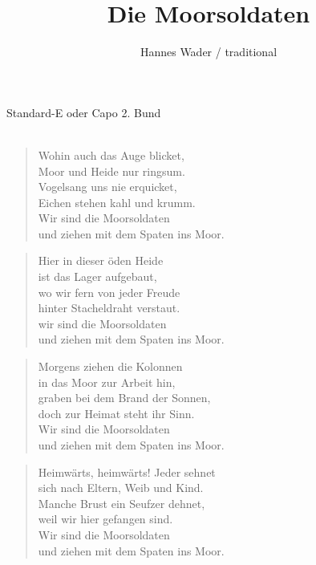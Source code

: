 \documentclass[9pt,a4paper,oneside, onecolumn]{article}
\author{Hannes Wader / traditional}
\title{Die Moorsoldaten}
\date{}
\begin{document}
\maketitle
\thispagestyle{empty}

Standard-E oder Capo 2. Bund\\
\mbox{
}\\


\begin{verse}
 
Wohin auch das Auge blicket,\\
Moor und Heide nur ringsum.\\
Vogelsang uns nie erquicket, \\
Eichen stehen kahl und krumm.\\
Wir sind die Moorsoldaten \\
und ziehen mit dem Spaten ins Moor.\\
\end{verse}

\begin{verse}
Hier in dieser öden Heide\\
ist das Lager aufgebaut,\\
wo wir fern von jeder Freude\\
hinter Stacheldraht verstaut.\\
wir sind die Moorsoldaten\\
und ziehen mit dem Spaten ins Moor.\\
\end{verse}

\begin{verse}
Morgens ziehen die Kolonnen\\
in das Moor zur Arbeit hin,\\
graben bei dem Brand der Sonnen,\\
doch zur Heimat steht ihr Sinn.\\
Wir sind die Moorsoldaten\\
und ziehen mit dem Spaten ins Moor.\\
\end{verse}

\begin{verse}       
Heimwärts, heimwärts! Jeder sehnet\\
sich nach Eltern, Weib und Kind.\\
Manche Brust ein Seufzer dehnet,\\
weil wir hier gefangen sind.\\
Wir sind die Moorsoldaten\\
und ziehen mit dem Spaten ins Moor.\\
\end{verse}
\end{document}
